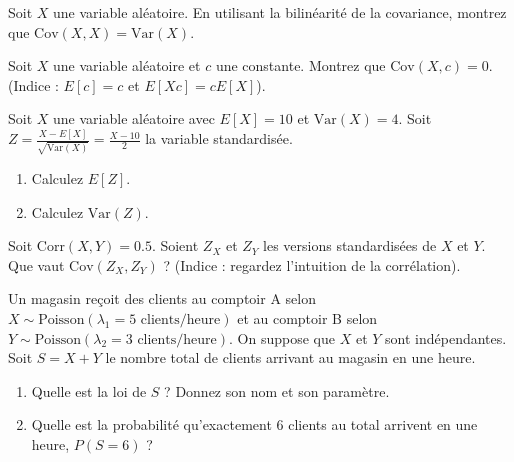 \begin{exercicebox}
Soit $X$ une variable aléatoire. En utilisant la bilinéarité de la covariance, montrez que $\text{Cov}(X, X) = \text{Var}(X)$.
\end{exercicebox}

\begin{exercicebox}
Soit $X$ une variable aléatoire et $c$ une constante.
Montrez que $\text{Cov}(X, c) = 0$. (Indice : $E[c]=c$ et $E[Xc] = cE[X]$).
\end{exercicebox}


\begin{exercicebox}
Soit $X$ une variable aléatoire avec $E[X] = 10$ et $\text{Var}(X) = 4$.
Soit $Z = \frac{X - E[X]}{\sqrt{\text{Var}(X)}} = \frac{X - 10}{2}$ la variable standardisée.
\begin{enumerate}
    \item Calculez $E[Z]$.
    \item Calculez $\text{Var}(Z)$.
\end{enumerate}
\end{exercicebox}

\begin{exercicebox}
Soit $\text{Corr}(X,Y) = 0.5$. Soient $Z_X$ et $Z_Y$ les versions standardisées de $X$ et $Y$.
Que vaut $\text{Cov}(Z_X, Z_Y)$ ? (Indice : regardez l'intuition de la corrélation).
\end{exercicebox}

\begin{exercicebox}
Un magasin reçoit des clients au comptoir A selon $X \sim \text{Poisson}(\lambda_1=5 \text{ clients/heure})$ et au comptoir B selon $Y \sim \text{Poisson}(\lambda_2=3 \text{ clients/heure})$. On suppose que $X$ et $Y$ sont indépendantes.
Soit $S = X+Y$ le nombre total de clients arrivant au magasin en une heure.
\begin{enumerate}
    \item Quelle est la loi de $S$ ? Donnez son nom et son paramètre.
    \item Quelle est la probabilité qu'exactement 6 clients au total arrivent en une heure, $P(S=6)$ ?
\end{enumerate}
\end{exercicebox}

